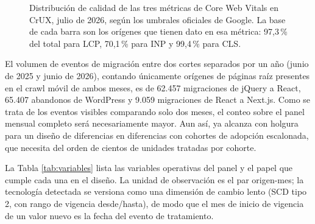 \documentclass[12pt, a4paper]{article}
\begin{document}
\begin{figure}[H]
\centering
{}
\caption{Distribución de calidad de las tres métricas de Core Web Vitals en CrUX, julio de 2026, según los umbrales oficiales de Google. La base de cada barra son los orígenes que tienen dato en esa métrica: 97,3\,\% del total para LCP, 70,1\,\% para INP y 99,4\,\% para CLS.}
\label{fig:semaforo}
\end{figure}

El volumen de eventos de migración entre dos cortes separados por un año (junio de 2025 y junio de 2026), contando únicamente orígenes de páginas raíz presentes en el crawl móvil de ambos meses, es de 62.457 migraciones de jQuery a React, 65.407 abandonos de WordPress y 9.059 migraciones de React a Next.js. Como se trata de los eventos visibles comparando solo dos meses, el conteo sobre el panel mensual completo será necesariamente mayor. Aun así, ya alcanza con holgura para un diseño de diferencias en diferencias con cohortes de adopción escalonada, que necesita del orden de cientos de unidades tratadas por cohorte.

La Tabla \ref{tab:variables} lista las variables operativas del panel y el papel que cumple cada una en el diseño. La unidad de observación es el par origen-mes; la tecnología detectada se versiona como una dimensión de cambio lento (SCD tipo 2, con rango de vigencia desde/hasta), de modo que el mes de inicio de vigencia de un valor nuevo es la fecha del evento de tratamiento.
\end{document}
